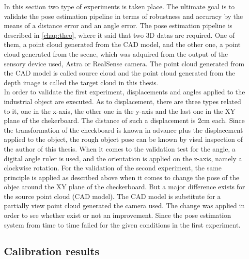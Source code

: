 In this section two type of experiments is taken place. The ultimate goal is to validate the pose estimation pipeline in terms of robustness and accuracy by the means of a distance error and an angle error. The pose estimation pipeline is described in \ref{chap:theo}, where it said that two 3D datas are required. One of them, a point cloud generated from the CAD model, and the other one, a point cloud generated from the scene, which was adquired from the output of the sensory device used, Astra or RealSense camera. The point cloud generated from the CAD model is called source cloud and the point cloud generated from the depth image is called the target cloud in this thesis.\\
In order to validate the first experiment, displacements and angles applied to the industrial object are executed. As to displacement, there are three types related to it, one in the x-axis, the other one in the y-axis and the last one in the XY plane of the chekerboard. The distance of such a displacement is 2cm each. Since the transformation of the checkboard is known in advance plus the displacement applied to the object, the rough object pose can be known by visul inspection of the author of this thesis. When it comes to the validation test for the angle, a digital angle ruler is used, and the orientation is applied on the z-axis, namely a clockwise rotation. For the validation of the second experiment, the same principle is applied as described above when it comes to change the pose of the objec around the XY plane of the checkerboard. But a major difference exists for the source point cloud (CAD model). The CAD model is substitute for a partially view point cloud generated the camera used. The change was applied in order to see whether exist or not an improvement. Since the pose estimation system from time to time failed for the given conditions in the first experiment.


\subsection{Calibration results}


